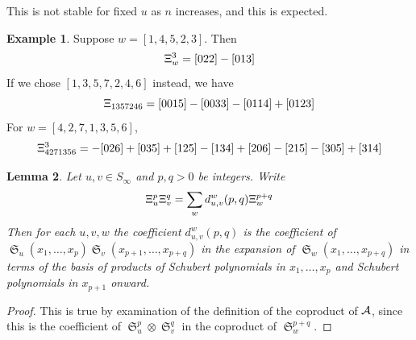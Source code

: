 \documentclass{amsart}
\newtheorem{lemma}{Lemma}[subsection]
\theoremstyle{definition}
\newtheorem{example}[lemma]{Example}
\theoremstyle{remark}
\numberwithin{equation}{subsection}
\DeclareMathOperator{\sch}{\mathfrak{S}}
\newcommand{\code}{\mathfrak{c}}
\begin{document}

This is not stable for fixed $u$ as $n$ increases, and this is expected.


\begin{example}
Suppose $w = [1,4,5,2,3]$. Then
$$\Xi_w^3 = [022] - [013]$$
If we chose $[1,3,5,7,2,4,6]$ instead, we have
$$\Xi_{1357246} = [0015] - [0033] - [0114] + [0123]$$
For $w=[4,2,7,1,3,5,6]$,
$$\Xi_{4271356}^3 = -[026] + [035] + [125] - [134] + [206] - [215] - [305] + [314]$$
\end{example}

\newcommand{\maxd}{\mathfrak{m}}
\newcommand{\shup}{{\uparrow}}


\begin{lemma}
	Let $u,v\in S_\infty$ and $p,q>0$ be integers. Write
	$$\Xi_u^p\Xi_v^q = \sum_w d_{u,v}^w(p,q)\Xi_w^{p+q}$$
	Then for each $u,v,w$ the coefficient $d_{u,v}^w(p,q)$ is the coefficient of $\sch_u(x_1,\ldots,x_p)\sch_v(x_{p+1},\ldots,x_{p+q})$ in the expansion of $\sch_w(x_1,\ldots,x_{p+q})$ in terms of the basis of products of Schubert polynomials in $x_1,\ldots,x_p$ and Schubert polynomials in $x_{p+1}$ onward.
\end{lemma}
\begin{proof}
	This is true by examination of the definition of the coproduct of $\mathcal{A}$, since this is the coefficient of $\sch_u^p\otimes \sch_v^q$ in the coproduct of $\sch_w^{p+q}$.
\end{proof}
\end{document}
